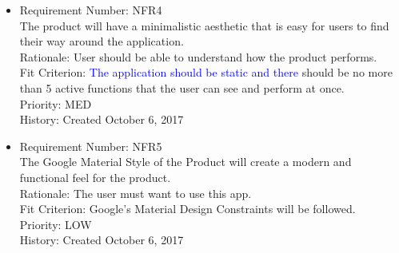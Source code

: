 \documentclass[12pt, titlepage]{article}
\begin{document}
\begin{itemize}
	\item Requirement Number: NFR4\\
The product will have a minimalistic aesthetic that is easy for users to find their way around the application.\\
Rationale: User should be able to understand how the product performs.\\
Fit Criterion: \textcolor{blue}{The application should be static and there} should be no more than 5 active functions that the user can see and perform at once.\\
Priority: MED\\
History: Created October 6, 2017

	\item Requirement Number: NFR5\\
The Google Material Style of the Product will create a modern and functional feel for the product.\\
Rationale: The user must want to use this app.\\
Fit Criterion: Google’s Material Design Constraints will be followed.\\
Priority: LOW\\
History: Created October 6, 2017

\end{itemize}
\end{document}
